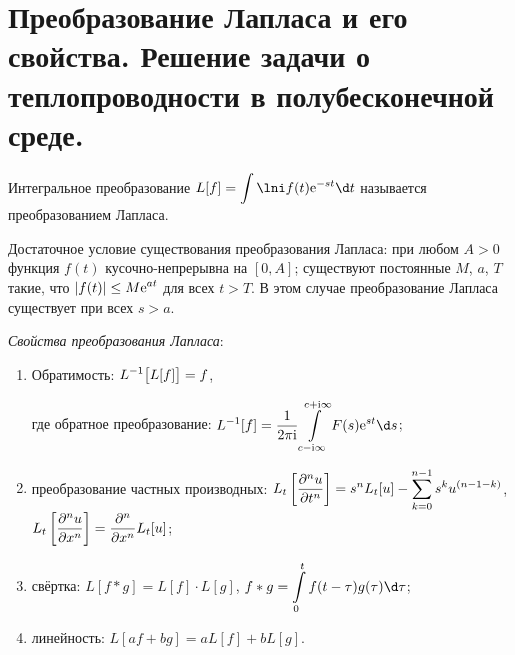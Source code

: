 \chapter{Преобразование Лапласа и его свойства. Решение задачи о
теплопроводности в полубесконечной среде.}

Интегральное преобразование \( \ds L[f] = \int\lni f(t)\e^{-st}\d t \)
называется преобразованием Лапласа.

Достаточное условие существования преобразования Лапласа: при любом \( A > 0 \)
функция \( f(t) \) кусочно-непрерывна на \( [0, A] \); существуют постоянные \( M \), \( a \), \( T \)
такие, что \( \displaystyle |f(t)| \le M\mathrm{e}^{at} \) для всех \( t > T \). В этом случае
преобразование Лапласа существует при всех \( s > a \).

\emph{Свойства преобразования Лапласа}:
\begin{enumerate}
    \item Обратимость: \( \displaystyle L^{-1}\bigl[L[f]\bigr] = f \),
    
    где обратное преобразование: \( \ds L^{-1}[f] = \frac{1}{2\pi\i}
    \int\limits_{c-\i\infty}^{c+\i\infty} F(s)\e^{st}\d s \);
    
    \item преобразование частных производных:
    \( \displaystyle L_t\left[\frac{\partial^{n} u}{\partial t^{n}}\right] = s^nL_t[u] - \sum\limits_{k=0}^{n-1}
    s^k u^{(n - 1 - k)} \),
    \( \displaystyle L_t\left[\frac{\partial^{n} u}{\partial x^{n}}\right] = \frac{\partial^{n} }{\partial x^{n}}L_t[u] \);
    
    \item свёртка: \( L[f*g] = L[f]\cdot L[g] \),
    \( \ds f*g = \int\limits_0^t f(t-\tau)g(\tau)\d\tau \);
    
    \item линейность: \( L[af + bg] = aL[f] + bL[g] \).
\end{enumerate}

